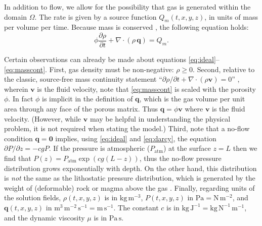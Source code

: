 \documentclass[11pt]{amsart}
\newcommand{\bq}{\mathbf{q}}
\newcommand{\bv}{\mathbf{v}}
\newcommand{\bzero}{\bm{0}}
\newcommand{\Div}{\nabla\cdot}
\newcommand{\Patm}{P_{\text{atm}}}
\begin{document}
In addition to flow, we allow for the possibility that gas is generated within the domain $\Omega$.  The rate is given by a source function $Q_m(t,x,y,z)$, in units of mass per volume per time.  Because mass is conserved \citep{Tadmor2012}, the following equation holds:
\begin{equation}
\phi \frac{\partial \rho}{\partial t} + \Div \left(\rho\, \bq\right) = Q_m. \label{eq:masscont}
\end{equation}

Certain observations can already be made about equations \eqref{eq:ideal}--\eqref{eq:masscont}.  First, gas density must be non-negative: $\rho\ge 0$.  Second, relative to the classic, source-free mass continuity statement ``$\partial\rho/\partial t + \Div(\rho \bv)=0$'' \citep[equation (4.3)]{Tadmor2012}, wherein $\bv$ is the fluid velocity, note that \eqref{eq:masscont} is scaled with the porosity $\phi$.  In fact $\phi$ is implicit in the definition of $\bq$, which is the gas volume per unit area through any face of the porous matrix.  Thus $\bq = \phi \bv$ where $\bv$ is the fluid velocity.  (However, while $\bv$ may be helpful in understanding the physical problem, it is not required when stating the model.)  Third, note that a no-flow condition $\bq=\bzero$ implies, using \eqref{eq:ideal} and \eqref{eq:darcy}, the equation $\partial P/\partial z = -cg P$.  If the pressure is atmospheric ($\Patm$) at the surface $z=L$ then we find that $P(z) = \Patm \exp(cg(L-z))$, thus the no-flow pressure distribution grows exponentially with depth.  On the other hand, this distribution is \emph{not} the same as the lithostatic pressure distribution, which is generated by the weight of (deformable) rock or magma above the gas \citep[equation (5)]{Collinson2012}.  Finally, regarding units of the solution fields, $\rho(t,x,y,z)$ is in $\text{kg}\,\text{m}^{-3}$, $P(t,x,y,z)$ in $\text{Pa} = \text{N}\,\text{m}^{-2}$, and $\bq(t,x,y,z)$ in $\text{m}^3\,\text{m}^{-2}\,\text{s}^{-1} = \text{m}\,\text{s}^{-1}$.  The constant $c$ is in $\text{kg}\,\text{J}^{-1} = \text{kg}\,\text{N}^{-1}\,\text{m}^{-1}$, and the dynamic viscosity $\mu$ is in $\text{Pa}\,\text{s}$.
\end{document}
